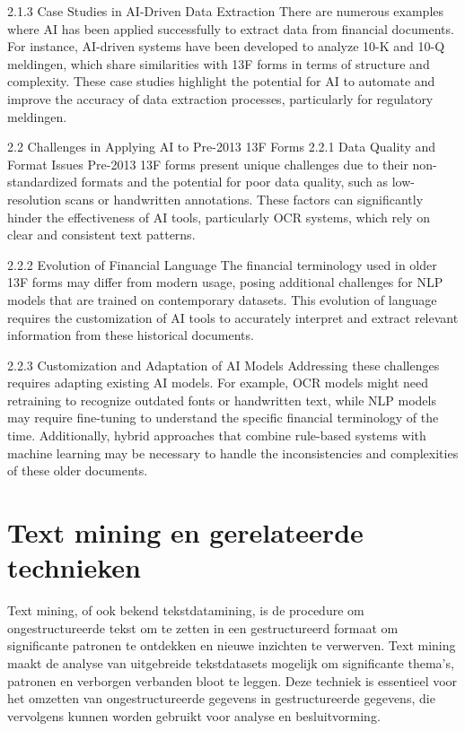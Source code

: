 2.1.3 Case Studies in AI-Driven Data Extraction
There are numerous examples where AI has been applied successfully to extract data from financial documents. For instance, AI-driven systems have been developed to analyze 10-K and 10-Q meldingen, which share similarities with 13F forms in terms of structure and complexity. These case studies highlight the potential for AI to automate and improve the accuracy of data extraction processes, particularly for regulatory meldingen.

2.2 Challenges in Applying AI to Pre-2013 13F Forms
2.2.1 Data Quality and Format Issues
Pre-2013 13F forms present unique challenges due to their non-standardized formats and the potential for poor data quality, such as low-resolution scans or handwritten annotations. These factors can significantly hinder the effectiveness of AI tools, particularly OCR systems, which rely on clear and consistent text patterns.

2.2.2 Evolution of Financial Language
The financial terminology used in older 13F forms may differ from modern usage, posing additional challenges for NLP models that are trained on contemporary datasets. This evolution of language requires the customization of AI tools to accurately interpret and extract relevant information from these historical documents.

2.2.3 Customization and Adaptation of AI Models
Addressing these challenges requires adapting existing AI models. For example, OCR models might need retraining to recognize outdated fonts or handwritten text, while NLP models may require fine-tuning to understand the specific financial terminology of the time. Additionally, hybrid approaches that combine rule-based systems with machine learning may be necessary to handle the inconsistencies and complexities of these older documents.

\section{Text mining en gerelateerde technieken}
Text mining, of ook bekend tekstdatamining, is de procedure om ongestructureerde tekst om te zetten in een gestructureerd formaat om significante patronen te ontdekken en nieuwe inzichten te verwerven. Text mining maakt de analyse van uitgebreide tekstdatasets mogelijk om significante thema's, patronen en verborgen verbanden bloot te leggen. Deze techniek is essentieel voor het omzetten van ongestructureerde gegevens in gestructureerde gegevens, die vervolgens kunnen worden gebruikt voor analyse en besluitvorming\autocite{IBM2024}.

